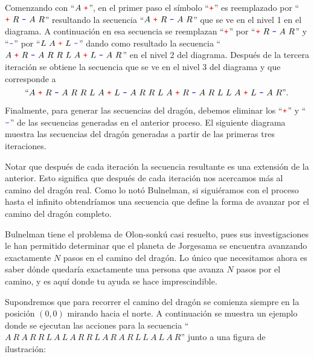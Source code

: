 \documentclass{oci}
\renewcommand{\u}{{\color{red}\texttt{+}}}
\renewcommand{\d}{{\color{blue}\texttt{-}}}
\begin{document}
Comenzando con ``$A\ \u$'', en el primer paso el símbolo ``$\u$'' es reemplazado por ``$\u\ R\ \d\ A\ R$'' resultando la secuencia ``$A\ \u\ R\ \d\ A\ R$'' que se ve en el nivel 1 en el diagrama.
A continuación en esa secuencia se reemplazan ``$\u$'' por ``$\u\ R\ \d\ A\ R$'' y ``$\d$'' por ``$L\ A\ \u\ L\ \d$'' dando como resultado la secuencia 
``$A\ \u\ R\ \d\ A\ R\ R\ L\ A\ \u\ L\ \d\ A\ R$'' en el nivel 2 del diagrama.
Después de la tercera iteración se obtiene la secuencia que se ve en el nivel 3 del diagrama y que corresponde a
$$\text{``}A\ \u\ R\ \d\ A\ R\ R\ L\ A\ \u\ L\ \d\ A\ R\ R\ L\ A\ \u\ R\ \d\ A\ R\ L\ L\ A\ \u\ L\ \d\ A\ R\text{''}.$$

Finalmente, para generar las secuencias del dragón, debemos eliminar los ``$\u$'' y ``$\d$'' de las secuencias generadas en el anterior proceso.
El siguiente diagrama muestra las secuencias del dragón generadas a partir de las primeras tres iteraciones.
\begin{center}
\scalebox{0.8}
{ 
}
\end{center}

Notar que después de cada iteración la secuencia resultante es una extensión de la anterior.
Esto significa que después de cada iteración nos acercamos más al camino del dragón real. Como lo notó Bulnelman, si siguiéramos con el proceso hasta el infinito obtendríamos una secuencia que define la forma de avanzar por el camino del dragón completo.

Bulnelman tiene el problema de Olon-sonkú casi resuelto, pues sus investigaciones le han permitido determinar que el planeta de Jorgesama se encuentra avanzando exactamente $N$ pasos en el camino del dragón. Lo único que necesitamos ahora es saber dónde quedaría exactamente una persona que avanza $N$ pasos por el camino, y es aquí donde tu ayuda se hace imprescindible.


Supondremos que para recorrer el camino del dragón se comienza siempre en la posición $(0,0)$ mirando hacia el norte.
A continuación se muestra un ejemplo donde se ejecutan las acciones para la secuencia ``$A\ R\ A\ R\ R\ L\ A\ L\ A\ R\ R\ L\ A\ R\ A\ R\ L\ L\ A\ L\ A\ R$'' junto a una figura de ilustración:
\\
\end{document}
